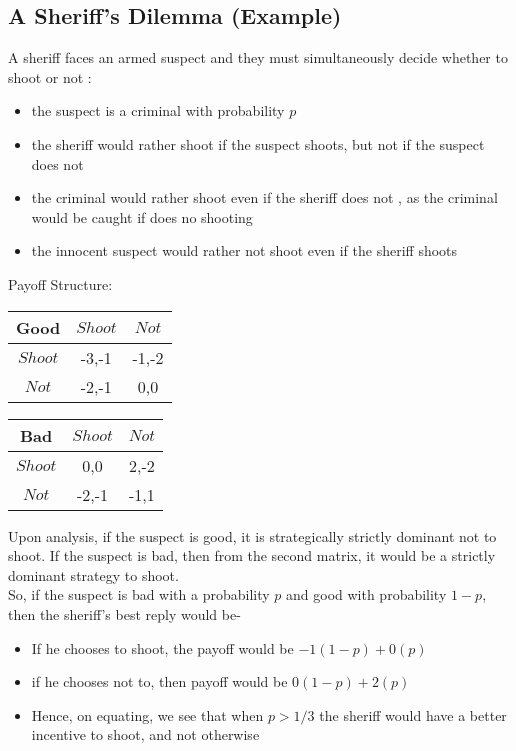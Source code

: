 \subsection{A Sheriff's Dilemma (Example)}
A sheriff faces an armed suspect and they must simultaneously decide whether to shoot or not :
\begin{itemize}
\item the suspect is a criminal with probability $p$
\item the sheriff would rather shoot if the suspect shoots, but not if the suspect does not
\item the criminal would rather shoot even if the sheriff does not , as the criminal would be caught if does no shooting
\item the innocent suspect would  rather not shoot even if the sheriff shoots
\end{itemize}
Payoff Structure:
\begin{center}\begin{tabular}{|c|c|c|} \hline
Good & $Shoot$ & $Not$ \\ \hline
$Shoot$ & -3,-1 & -1,-2 \\ \hline
$Not$ & -2,-1 & 0,0 \\ \hline 
\end{tabular}\hspace{1.0cm}\begin{tabular}{|c|c|c|} \hline
Bad & $Shoot$ & $Not$ \\ \hline
$Shoot$ & 0,0 & 2,-2 \\ \hline
$Not$ & -2,-1 & -1,1 \\ \hline 
\end{tabular}\end{center}
Upon analysis, if the suspect is good, it is strategically strictly dominant not to shoot. If the suspect is bad, then from the second matrix, it would be a strictly dominant strategy to shoot. \\
So, if the suspect is bad with a probability $p$ and good with probability $1-p$, then the sheriff's best reply would be- 
\begin{itemize}
\item If he chooses to shoot, the payoff would be $-1(1-p) + 0(p)$
\item if he chooses not to, then payoff would be $0(1-p) + 2(p)$
\item Hence, on equating, we see that when $p > 1/3$ the sheriff would have a better incentive to shoot, and not otherwise
\end{itemize}